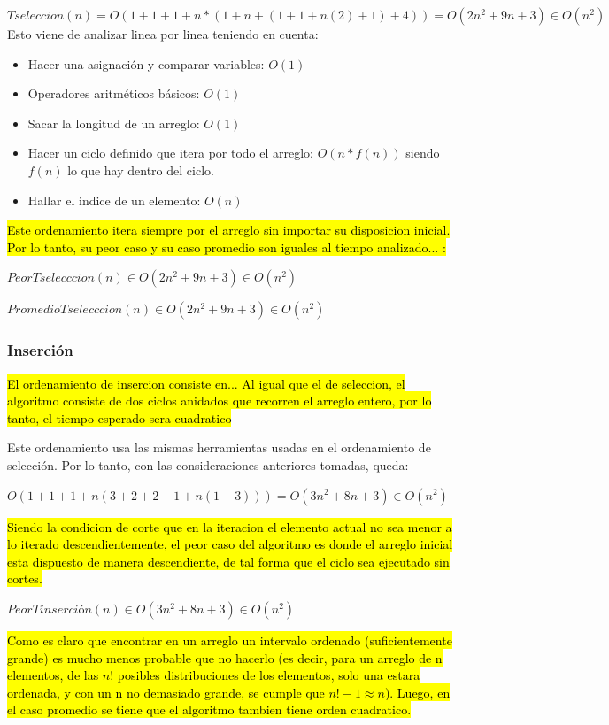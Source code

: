 \documentclass[article,a4paper]{article}
\begin{document}
$T seleccion(n) = O(1 + 1 + 1 + n * (1 + n + (1 + 1 + n (2) + 1)  + 4 ) ) = O(2n^2 + 9n + 3) \in O(n^2)$\\

Esto viene de analizar linea por linea teniendo en cuenta:
\begin{itemize}
\item Hacer una asignación y comparar variables: $O(1)$
\item Operadores aritméticos básicos: $O(1)$
\item Sacar la longitud de un arreglo: $O(1)$
\item Hacer un ciclo definido que itera por todo el arreglo: $O(n * f(n))$ siendo $f(n)$ lo que hay dentro del ciclo.
\item Hallar el indice de un elemento: $O(n)$
\end{itemize}

\hl{Este ordenamiento itera siempre por el arreglo sin importar su disposicion inicial. Por lo tanto, su peor caso y su caso promedio son iguales al tiempo analizado... :}

$Peor T selecccion(n) \in O(2n^2 + 9n + 3) \in O(n^2)$ 

$Promedio T selecccion(n)  \in O(2n^2 + 9n + 3) \in O(n^2)$


\subsubsection{Inserción}

\hl{El ordenamiento de insercion consiste en... Al igual que el de seleccion, el algoritmo consiste de dos ciclos anidados que recorren el arreglo entero, por lo tanto, el tiempo esperado sera cuadratico}

Este ordenamiento usa las mismas herramientas usadas en el ordenamiento de selección. Por lo tanto, con las consideraciones anteriores tomadas, queda:

$O( 1 + 1 + 1 + n(3 + 2 + 2 + 1 + n(1 + 3) ) ) = O(3n^2 + 8n + 3) \in O(n^2)$

\hl{Siendo la condicion de corte que en la iteracion el elemento actual no sea menor a lo iterado descendientemente, el peor caso del algoritmo es donde el arreglo inicial esta dispuesto de manera descendiente, de tal forma que el ciclo sea ejecutado sin cortes.}

$PeorTinserción(n) \in O(3n^2 + 8n + 3) \in O(n^2)$

\hl{Como es claro que encontrar en un arreglo un intervalo ordenado (suficientemente grande) es mucho menos probable que no hacerlo (es decir, para un arreglo de n elementos, de las $n!$ posibles distribuciones de los elementos, solo una estara ordenada, y con un n no demasiado grande, se cumple que $n!-1 \approx n$). Luego, en el caso promedio se tiene que el algoritmo tambien tiene orden cuadratico.}
\end{document}
